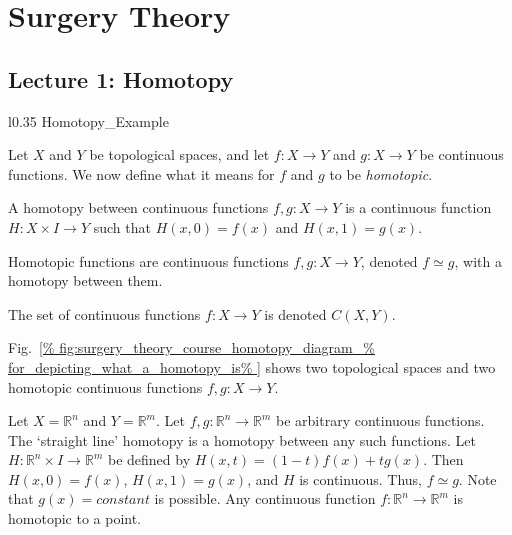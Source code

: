 \documentclass[crop=false,class=article,oneside]{standalone}
\begin{document}
    \ifx\ifmathcoursessurgery\undefined
        \section*{Surgery Theory}
        \setcounter{section}{1}
        \renewcommand\thefigure{%
            \arabic{section}.\arabic{figure}%
        }
        \renewcommand\thesubfigure{%
            \arabic{section}.\arabic{figure}.\arabic{subfigure}%
        }
    \fi
    \subsection{Lecture 1: Homotopy}
        \begin{wrapfigure}[8]{l}{0.35\textwidth}
            \centering
            \captionsetup{type=figure}
            {Homotopy_Example}
            \caption[Homotopy Diagram]{%
                Diagram for a homotopy between two functions
                $f,g:X\rightarrow Y$.%
            }
            \label{%
                fig:surgery_theory_course_homotopy_diagram_%
                for_depicting_what_a_homotopy_is%
            }
        \end{wrapfigure}
        Let $X$ and $Y$ be topological spaces, and let
        $f:{X}\rightarrow{Y}$ and $g:{X}\rightarrow{Y}$
        be continuous functions. We now define what it
        means for $f$ and $g$ to be \textit{homotopic}.
        \begin{definition}
            A homotopy between continuous functions
            $f,g:{X}\rightarrow{Y}$ is a continuous
            function $H:{X}\times{I}\rightarrow{Y}$
            such that $H(x,0)=f(x)$ and $H(x,1)=g(x)$.
        \end{definition}
        \begin{definition}
            Homotopic functions are continuous functions
            $f,g:{X}\rightarrow{Y}$, denoted ${f}\simeq{g}$,
            with a homotopy between them.
        \end{definition}
        \begin{notation}
            The set of continuous functions
            $f:{X}\rightarrow{Y}$ is denoted $C(X,Y)$.
        \end{notation}
        Fig.~\ref{%
            fig:surgery_theory_course_homotopy_diagram_%
            for_depicting_what_a_homotopy_is%
        }
        shows two topological spaces and two homotopic
        continuous functions $f,g:{X}\rightarrow{Y}$.
        \begin{example}
            Let $X=\mathbb{R}^{n}$ and $Y=\mathbb{R}^{m}$. Let
            $f,g:\mathbb{R}^{n}\rightarrow\mathbb{R}^{m}$
            be arbitrary continuous functions.
            The `straight line' homotopy is a homotopy
            between any such functions. Let
            $H:\mathbb{R}^{n}\times{I}\rightarrow\mathbb{R}^{m}$
            be defined by $H(x,t)=(1-t)f(x)+tg(x)$. Then
            $H(x,0)=f(x)$, $H(x,1)=g(x)$, and
            $H$ is continuous. Thus, ${f}\simeq{g}$.
            Note that $g(x)=constant$ is possible.
            Any continuous function
            $f:\mathbb{R}^{n}\rightarrow\mathbb{R}^{m}$
            is homotopic to a point.
        \end{example}
\end{document}

